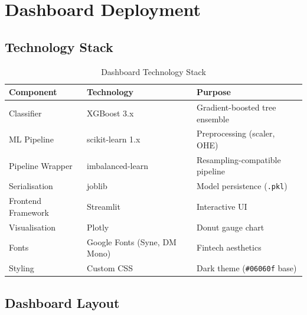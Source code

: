 \documentclass[12pt,a4paper]{article}
\theoremstyle{definition}
\newcommand{\code}[1]{\texttt{#1}}
\begin{document}
\newpage

\section{Dashboard Deployment}
\label{sec:dashboard}

\subsection{Technology Stack}

\begin{table}[H]
  \centering
  \caption{Dashboard Technology Stack}
  \label{tab:stack}
  \begin{tabular}{lll}
    \toprule
    \textbf{Component}    & \textbf{Technology}     & \textbf{Purpose} \\
    \midrule
    Classifier            & XGBoost 3.x             & Gradient-boosted tree ensemble \\
    ML Pipeline           & scikit-learn 1.x        & Preprocessing (scaler, OHE) \\
    Pipeline Wrapper      & imbalanced-learn        & Resampling-compatible pipeline \\
    Serialisation         & joblib                  & Model persistence (\code{.pkl}) \\
    Frontend Framework    & Streamlit               & Interactive UI \\
    Visualisation         & Plotly                  & Donut gauge chart \\
    Fonts                 & Google Fonts (Syne, DM Mono) & Fintech aesthetics \\
    Styling               & Custom CSS              & Dark theme (\code{\#06060f} base) \\
    \bottomrule
  \end{tabular}
\end{table}

\subsection{Dashboard Layout}
\end{document}
